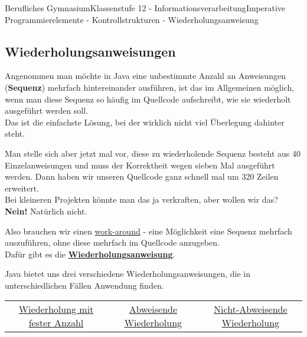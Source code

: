 \documentclass[11pt,oneside,openany,headings=optiontotoc,11pt,numbers=noenddot]{article}
\begin{document}
	\begin{worksheet}{Berufliches Gymnasium}{Klassenstufe 12 - Informationsverarbeitung}{Imperative Programmierelemente - Kontrollstrukturen - Wiederholungsanweisung}
		\setcounter{section}{2}
		\setcounter{subsection}{2}
		\setlength{\columnseprule}{0pt}
		\subsection{Wiederholungsanweisungen}
		Angenommen man möchte in Java eine unbestimmte Anzahl an Anweisungen (\textbf{Sequenz}) mehrfach hintereinander ausführen, ist das im Allgemeinen möglich, wenn man diese Sequenz so häufig im Quellcode aufschreibt, wie sie wiederholt ausgeführt werden soll.\\
		Das ist die einfachste Lösung, bei der wirklich nicht viel Überlegung dahinter steht.\\
		\par\noindent
		Man stelle sich aber jetzt mal vor, diese zu wiederholende Sequenz besteht aus 40 Einzelanweisungen und muss der Korrektheit wegen sieben Mal ausgeführt werden. Dann haben wir unseren Quellcode ganz schnell mal um 320 Zeilen erweitert.\\
		Bei kleineren Projekten könnte man das ja verkraften, aber wollen wir das? \textbf{Nein!} Natürlich nicht.
		\par
		Also brauchen wir einen \underline{work-around} - eine Möglichkeit eine Sequenz mehrfach auszuführen, ohne diese mehrfach im Quellcode anzugeben.\\
		Dafür gibt es die \textbf{\underline{Wiederholungsanweisung}}.\\
		\par\noindent
		Java bietet uns drei verschiedene Wiederholungsanweisungen, die in unterschiedlichen Fällen Anwendung finden.\\
		\begin{tabularx}{\textwidth}{ccc}
			\underline{Wiederholung mit fester Anzahl} & \underline{Abweisende Wiederholung} & \underline{Nicht-Abweisende Wiederholung}
		\end{tabularx}

\end{worksheet}
\end{document}
